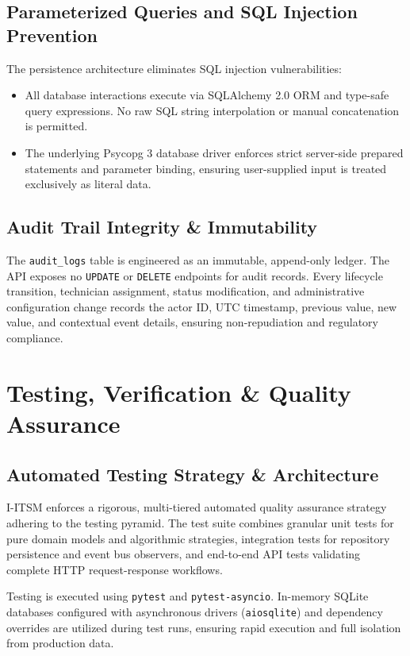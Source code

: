 \documentclass[11pt,a4paper,oneside]{report}
\begin{document}
\section{Parameterized Queries and SQL Injection Prevention}
\label{sec:sec_injection}
The persistence architecture eliminates SQL injection vulnerabilities:
\begin{itemize}
    \item All database interactions execute via SQLAlchemy 2.0 ORM and type-safe query expressions. No raw SQL string interpolation or manual concatenation is permitted.
    \item The underlying Psycopg 3 database driver enforces strict server-side prepared statements and parameter binding, ensuring user-supplied input is treated exclusively as literal data.
\end{itemize}

\section{Audit Trail Integrity \& Immutability}
\label{sec:sec_audit_integrity}
The \texttt{audit\_logs} table is engineered as an immutable, append-only ledger. The API exposes no \texttt{UPDATE} or \texttt{DELETE} endpoints for audit records. Every lifecycle transition, technician assignment, status modification, and administrative configuration change records the actor ID, UTC timestamp, previous value, new value, and contextual event details, ensuring non-repudiation and regulatory compliance.


\chapter{Testing, Verification \& Quality Assurance}
\label{ch:testing}

\section{Automated Testing Strategy \& Architecture}
\label{sec:test_strategy}
I-ITSM enforces a rigorous, multi-tiered automated quality assurance strategy adhering to the testing pyramid. The test suite combines granular unit tests for pure domain models and algorithmic strategies, integration tests for repository persistence and event bus observers, and end-to-end API tests validating complete HTTP request-response workflows.

Testing is executed using \texttt{pytest} and \texttt{pytest-asyncio}. In-memory SQLite databases configured with asynchronous drivers (\texttt{aiosqlite}) and dependency overrides are utilized during test runs, ensuring rapid execution and full isolation from production data.
\end{document}

